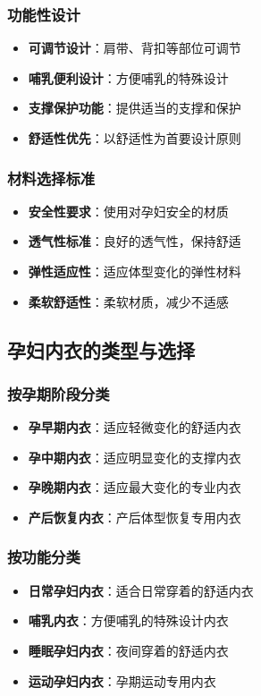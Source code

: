 \documentclass[12pt,UTF8]{ctexbook}
\begin{document}
\subsubsection{功能性设计}
\begin{itemize}[leftmargin=2cm]
	\item \textbf{可调节设计}：肩带、背扣等部位可调节
	\item \textbf{哺乳便利设计}：方便哺乳的特殊设计
	\item \textbf{支撑保护功能}：提供适当的支撑和保护
	\item \textbf{舒适性优先}：以舒适性为首要设计原则
\end{itemize}

\subsubsection{材料选择标准}
\begin{itemize}[leftmargin=2cm]
	\item \textbf{安全性要求}：使用对孕妇安全的材质
	\item \textbf{透气性标准}：良好的透气性，保持舒适
	\item \textbf{弹性适应性}：适应体型变化的弹性材料
	\item \textbf{柔软舒适性}：柔软材质，减少不适感
\end{itemize}

\subsection{孕妇内衣的类型与选择}
\subsubsection{按孕期阶段分类}
\begin{itemize}[leftmargin=2cm]
	\item \textbf{孕早期内衣}：适应轻微变化的舒适内衣
	\item \textbf{孕中期内衣}：适应明显变化的支撑内衣
	\item \textbf{孕晚期内衣}：适应最大变化的专业内衣
	\item \textbf{产后恢复内衣}：产后体型恢复专用内衣
\end{itemize}

\subsubsection{按功能分类}
\begin{itemize}[leftmargin=2cm]
	\item \textbf{日常孕妇内衣}：适合日常穿着的舒适内衣
	\item \textbf{哺乳内衣}：方便哺乳的特殊设计内衣
	\item \textbf{睡眠孕妇内衣}：夜间穿着的舒适内衣
	\item \textbf{运动孕妇内衣}：孕期运动专用内衣
\end{itemize}
\end{document}
